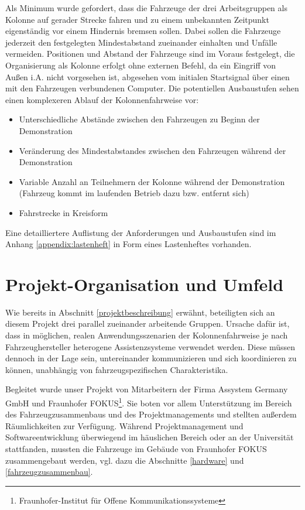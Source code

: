 \documentclass[a4paper, 12pt, titlepage]{scrartcl}
\begin{document}
		Als Minimum wurde gefordert, dass die Fahrzeuge der drei Arbeitsgruppen als Kolonne auf gerader Strecke fahren und zu einem unbekannten
		Zeitpunkt eigenständig vor einem Hindernis bremsen sollen. Dabei sollen die Fahrzeuge jederzeit den festgelegten Mindestabstand zueinander
		einhalten und Unfälle vermeiden. Positionen und Abstand der Fahrzeuge sind im Voraus festgelegt, die Organisierung als Kolonne erfolgt ohne
		externen Befehl, da ein Eingriff von Außen i.A. nicht vorgesehen ist, abgesehen vom initialen Startsignal über einen mit den
		Fahrzeugen verbundenen Computer. Die potentiellen Ausbaustufen sehen einen komplexeren Ablauf der Kolonnenfahrweise vor:
		\begin{itemize}
			\item Unterschiedliche Abstände zwischen den Fahrzeugen zu Beginn der Demonstration
			\item Veränderung des Mindestabstandes zwischen den Fahrzeugen während der Demonstration
			\item Variable Anzahl an Teilnehmern der Kolonne während der Demonstration (Fahrzeug kommt im laufenden Betrieb dazu bzw. entfernt sich)
			\item Fahrstrecke in Kreisform
		\end{itemize}

		Eine detailliertere Auflistung der Anforderungen und Ausbaustufen sind im Anhang \ref{appendix:lastenheft} in Form eines Lastenheftes vorhanden.

	\section{Projekt-Organisation und Umfeld}
	\label{umfeld}
		Wie bereits in Abschnitt \ref{projektbeschreibung} erwähnt, beteiligten sich an diesem Projekt drei parallel zueinander arbeitende Gruppen.
		Ursache dafür ist, dass in möglichen, realen Anwendungsszenarien der Kolonnenfahrweise je nach Fahrzeughersteller heterogene
		Assistenzsysteme verwendet werden. Diese müssen dennoch in der Lage sein, untereinander kommunizieren und sich koordinieren zu können, unabhängig von fahrzeugspezifischen Charakteristika.

		Begleitet wurde unser Projekt von Mitarbeitern der Firma Assystem Germany GmbH und Fraunhofer FOKUS\footnote{Fraunhofer-Institut für Offene Kommunikationssysteme}.
		Sie boten vor allem Unterstützung im Bereich des Fahrzeugzusammenbaus und des Projektmanagements und stellten außerdem
		Räumlichkeiten zur Verfügung. Während Projektmanagement und Softwareentwicklung überwiegend im häuslichen Bereich oder an der
		Universität stattfanden, mussten die Fahrzeuge im Gebäude von Fraunhofer FOKUS zusammengebaut werden, vgl. dazu die Abschnitte \ref{hardware} und \ref{fahrzeugzusammenbau}.
\end{document}
